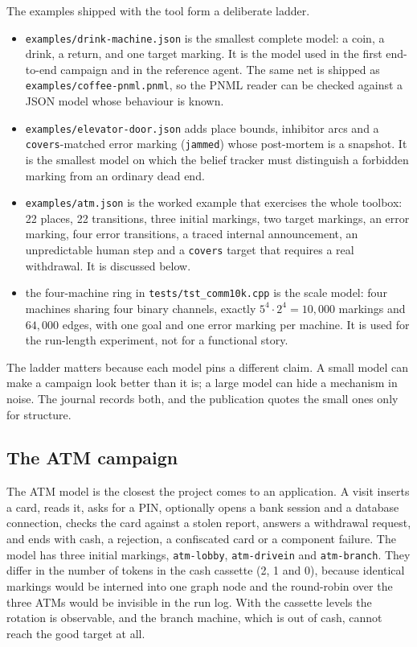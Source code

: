 \documentclass[11pt,a4paper]{article}
\begin{document}
The examples shipped with the tool form a deliberate ladder.

\begin{itemize}[leftmargin=2.2em]
  \item \texttt{examples/drink-machine.json} is the smallest complete model:
        a coin, a drink, a return, and one target marking.  It is the model
        used in the first end-to-end campaign and in the reference agent.
        The same net is shipped as \texttt{examples/coffee-pnml.pnml}, so the
        PNML reader can be checked against a JSON model whose behaviour is
        known.
  \item \texttt{examples/elevator-door.json} adds place bounds, inhibitor
        arcs and a \texttt{covers}-matched error marking (\texttt{jammed})
        whose post-mortem is a snapshot.  It is the smallest model on which
        the belief tracker must distinguish a forbidden marking from an
        ordinary dead end.
  \item \texttt{examples/atm.json} is the worked example that exercises the
        whole toolbox: 22 places, 22 transitions, three initial markings,
        two target markings, an error marking, four error transitions, a
        traced internal announcement, an unpredictable human step and a
        \texttt{covers} target that requires a real withdrawal.  It is
        discussed below.
  \item the four-machine ring in \texttt{tests/tst\_comm10k.cpp} is the scale
        model: four machines sharing four binary channels, exactly
        $5^4\cdot2^4=10{,}000$ markings and $64{,}000$ edges, with one goal
        and one error marking per machine.  It is used for the run-length
        experiment, not for a functional story.
\end{itemize}

The ladder matters because each model pins a different claim.  A small model
can make a campaign look better than it is; a large model can hide a
mechanism in noise.  The journal records both, and the publication quotes the
small ones only for structure.

\subsection{The ATM campaign}\label{sec:atm}

The ATM model is the closest the project comes to an application.  A visit
inserts a card, reads it, asks for a PIN, optionally opens a bank session and
a database connection, checks the card against a stolen report, answers a
withdrawal request, and ends with cash, a rejection, a confiscated card or a
component failure.  The model has three initial markings,
\texttt{atm-lobby}, \texttt{atm-drivein} and \texttt{atm-branch}.  They differ
in the number of tokens in the cash cassette (2, 1 and 0), because identical
markings would be interned into one graph node and the round-robin over the
three ATMs would be invisible in the run log.  With the cassette levels the
rotation is observable, and the branch machine, which is out of cash, cannot
reach the good target at all.
\end{document}
